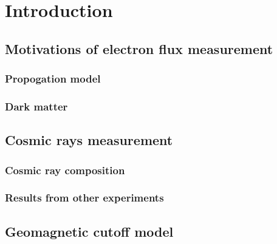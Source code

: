 \part{Introduction}

\chapter{Motivations of electron flux measurement}
\section{Propogation model}
\section{Dark matter}

\chapter{Cosmic rays measurement}
\section{Cosmic ray composition}
\section{Results from other experiments}

\chapter{Geomagnetic cutoff model}
